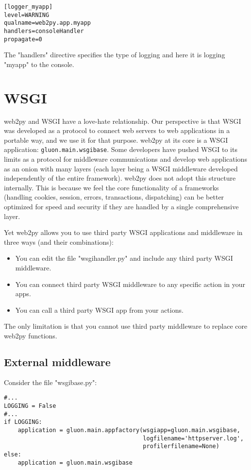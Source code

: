 \documentclass[justified,sixbynine,notoc]{tufte-book}
\def\ft{\small\tt}
\def\inxx#1{\index{#1}}
\begin{document}
\begin{fullwidth}
\begin{lstlisting}
[logger_myapp]
level=WARNING
qualname=web2py.app.myapp
handlers=consoleHandler
propagate=0
\end{lstlisting}

The "handlers" directive specifies the type of logging and here it is logging "myapp" to the console.

\goodbreak\section{WSGI}

\inxx{WSGI}
\noindent web2py and WSGI have a love-hate relationship. Our perspective is that WSGI was developed as a protocol to connect web servers to web applications in a portable way, and we use it for that purpose. web2py at its core is a WSGI application: {\ft gluon.main.wsgibase}. Some developers have pushed WSGI to its limits as a protocol for middleware communications and develop web applications as an onion with many layers (each layer being a WSGI middleware developed independently of the entire framework). web2py does not adopt this structure internally. This is because we feel the core functionality of a frameworks (handling cookies, session, errors, transactions, dispatching) can be better optimized for speed and security if they are handled by a single comprehensive layer.

Yet web2py allows you to use third party WSGI applications and middleware in three ways (and their combinations):
\begin{itemize}
\item You can edit the file "wsgihandler.py" and include any third party WSGI middleware.

\item You can connect third party WSGI middleware to any specific action in your apps.

\item You can call a third party WSGI app from your actions.
\end{itemize}

The only limitation is that you cannot use third party middleware to replace core web2py functions.

\goodbreak\subsection{External middleware}

Consider the file "wsgibase.py":
\begin{lstlisting}
#...
LOGGING = False
#...
if LOGGING:
    application = gluon.main.appfactory(wsgiapp=gluon.main.wsgibase,
                                        logfilename='httpserver.log',
                                        profilerfilename=None)
else:
    application = gluon.main.wsgibase
\end{lstlisting}


\end{fullwidth}
\end{document}
